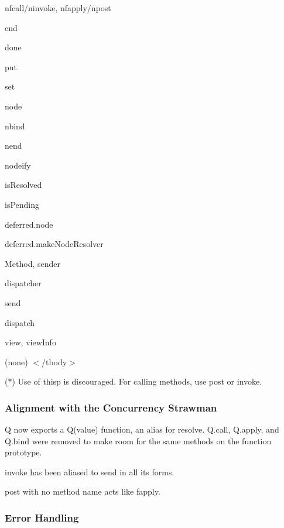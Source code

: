 {\ttfamily nfcall}/{\ttfamily ninvoke}, {\ttfamily nfapply}/{\ttfamily npost}  

{\ttfamily end} 

{\ttfamily done}  

{\ttfamily put} 

{\ttfamily set}  

{\ttfamily node} 

{\ttfamily nbind}  

{\ttfamily nend} 

{\ttfamily nodeify}  

{\ttfamily is\+Resolved} 

{\ttfamily is\+Pending}  

{\ttfamily deferred.\+node} 

{\ttfamily deferred.\+make\+Node\+Resolver}  

{\ttfamily Method}, {\ttfamily sender} 

{\ttfamily dispatcher}  

{\ttfamily send} 

{\ttfamily dispatch}  

{\ttfamily view}, {\ttfamily view\+Info} 

(none)  $<$/tbody$>$ 

($\ast$) Use of {\ttfamily thisp} is discouraged. For calling methods, use {\ttfamily post} or {\ttfamily invoke}.

\subsubsection*{Alignment with the Concurrency Strawman}


\begin{DoxyItemize}
\item Q now exports a {\ttfamily Q(value)} function, an alias for {\ttfamily resolve}. {\ttfamily Q.\+call}, {\ttfamily Q.\+apply}, and {\ttfamily Q.\+bind} were removed to make room for the same methods on the function prototype.
\item {\ttfamily invoke} has been aliased to {\ttfamily send} in all its forms.
\item {\ttfamily post} with no method name acts like {\ttfamily fapply}.
\end{DoxyItemize}

\subsubsection*{Error Handling}


